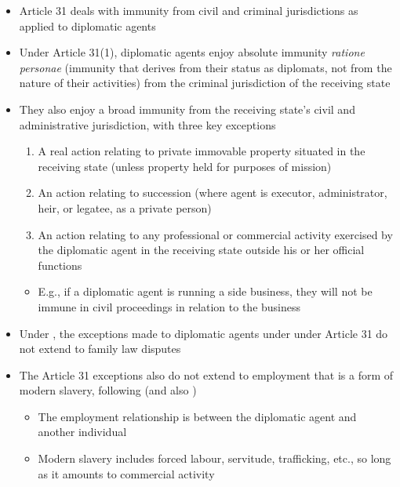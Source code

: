 \begin{itemize}
    \item Article 31 deals with immunity from civil and criminal jurisdictions as applied to diplomatic agents
    \item Under Article 31(1), diplomatic agents enjoy absolute immunity \textit{ratione personae} (immunity that derives from their status as diplomats, not from the nature of their activities) from the criminal jurisdiction of the receiving state
    \item They also enjoy a broad immunity from the receiving state's civil and administrative jurisdiction, with three key exceptions
    \begin{enumerate}
        \item A real action relating to private immovable property situated in the receiving state (unless property held for purposes of mission)
        \item An action relating to succession (where agent is executor, administrator, heir, or legatee, as a private person)
        \item An action relating to any professional or commercial activity exercised by the diplomatic agent in the receiving state outside his or her official functions
    \end{enumerate}
    \begin{itemize}
        \item E.g., if a diplomatic agent is running a side business, they will not be immune in civil proceedings in relation to the business
    \end{itemize}
    \item Under , the exceptions made to diplomatic agents under under Article 31 do not extend to family law disputes
    \item The Article 31 exceptions also do not extend to employment that is a form of modern slavery, following  (and also )
    \begin{itemize}
        \item The employment relationship is between the diplomatic agent and another individual
        \item Modern slavery includes forced labour, servitude, trafficking, etc., so long as it amounts to commercial activity
    \end{itemize}
\end{itemize}

